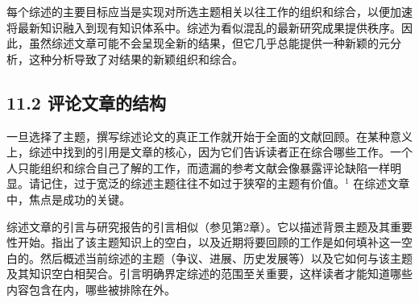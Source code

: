 每个综述的主要目标应当是实现对所选主题相关以往工作的组织和综合，以便加速将最新知识融入到现有知识体系中。综述为看似混乱的最新研究成果提供秩序。因此，虽然综述文章可能不会呈现全新的结果，但它几乎总能提供一种新颖的元分析，这种分析导致了对结果的新颖组织和综合。

\subsection*{11.2 评论文章的结构}
一旦选择了主题，撰写综述论文的真正工作就开始于全面的文献回顾。在某种意义上，综述中找到的引用是文章的核心，因为它们告诉读者正在综合哪些工作。一个人只能组织和综合自己了解的工作，而遗漏的参考文献会像暴露评论缺陷一样明显。请记住，过于宽泛的综述主题往往不如过于狭窄的主题有价值。${ }^{1}$ 在综述文章中，焦点是成功的关键。

综述文章的引言与研究报告的引言相似（参见第2章）。它以描述背景主题及其重要性开始。指出了该主题知识上的空白，以及近期将要回顾的工作是如何填补这一空白的。然后概述当前综述的主题（争议、进展、历史发展等）以及它如何与该主题及其知识空白相契合。引言明确界定综述的范围至关重要，这样读者才能知道哪些内容包含在内，哪些被排除在外。

